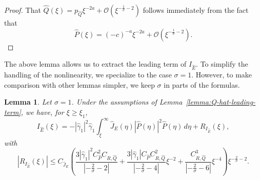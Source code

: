 \documentclass[11pt]{article}
\newtheorem{lemma}[definition]{Lemma}
\begin{document}
\begin{proof}
  That
  \(\hat{Q}(\xi) = p_{\hat{Q}}\xi^{-2a} +
  \mathcal{O}(\xi^{-\frac{1}{\sigma} - 2})\) follows immediately from
  the fact that
  \begin{equation*}
    \hat{P}(\xi) = (-c)^{-a}\xi^{-2a} + \mathcal{O}(\xi^{-\frac{1}{\sigma} - 2}).
  \end{equation*}
\end{proof}

The above lemma allows us to extract the leading term of
\(I_{\hat{E}}\). To simplify the handling of the nonlinearity, we
specialize to the case \(\sigma = 1\). However, to make comparison
with other lemmas simpler, we keep \(\sigma\) in parts of the
formulas.

\begin{lemma}\label{lemma:I_E-hat-enclosure}
  Let \(\sigma = 1\). Under the assumptions of
  Lemma~\ref{lemma:Q-hat-leading-term}, we have, for
  \(\xi \geq \xi_{1}\),
  \begin{equation*}
    I_{\hat{E}}(\xi)
    = -|\hat{\gamma}_{1}|^{2}\hat{\gamma}_{1}\int_{\xi}^{\infty} \hat{J}_{E}(\eta)|\hat{P}(\eta)|^{2}\hat{P}(\eta)\,d\eta
    + R_{I_{\hat{E}}}(\xi),
  \end{equation*}
  with
  \begin{equation*}
    |R_{I_{\hat{E}}}(\xi)|
    \leq C_{\hat{J}_{E}}
    \left(
    \frac{3|\hat{\gamma}_{1}|^{2}C_{\hat{P}}^{2}C_{R,\hat{Q}}}{|-\frac{2}{\sigma} - 2|}
    + \frac{3|\hat{\gamma}_{1}|C_{\hat{P}}C_{R,\hat{Q}}^{2}}{|-\frac{2}{\sigma} - 4|}\xi^{-2}
    + \frac{C_{R,\hat{Q}}^{3}}{|-\frac{2}{\sigma} - 6|}\xi^{-4}
    \right)\xi^{-\frac{2}{\sigma} - 2}.
  \end{equation*}
\end{lemma}
\end{document}
